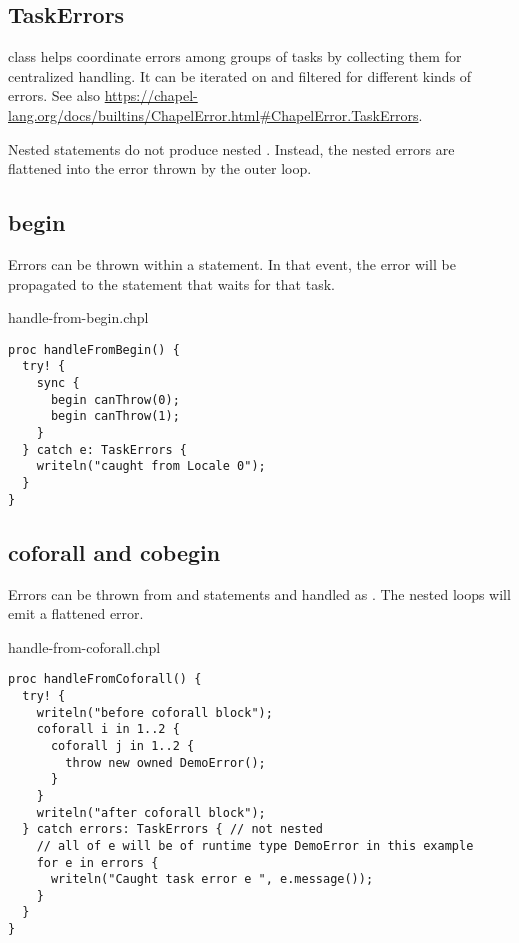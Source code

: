 \subsection{TaskErrors}
\label{TaskErrors}

 class helps coordinate errors among groups of tasks by collecting
them for centralized handling. It can be iterated on and filtered for
different kinds of errors. See also
\url{https://chapel-lang.org/docs/builtins/ChapelError.html#ChapelError.TaskErrors}.

Nested  statements do not produce nested .
Instead, the nested errors are flattened into the  error
thrown by the outer loop.

\subsection{begin}
\label{Errors_begin}

Errors can be thrown within a  statement. In that event, the error
will be propagated to the  statement that waits for that task.

\begin{chapelexample}{handle-from-begin.chpl}
\begin{chapel}
\begin{verbatim}
proc handleFromBegin() {
  try! {
    sync {
      begin canThrow(0);
      begin canThrow(1);
    }
  } catch e: TaskErrors {
    writeln("caught from Locale 0");
  }
}
\end{verbatim}
\end{chapel}
\end{chapelexample}

\subsection{coforall and cobegin}
\label{Errors_coforall_and_cobegin}

Errors can be thrown from  and 
statements and handled as . The nested 
loops will emit a flattened  error.

\begin{chapelexample}{handle-from-coforall.chpl}
\begin{chapel}
\begin{verbatim}
proc handleFromCoforall() {
  try! {
    writeln("before coforall block");
    coforall i in 1..2 {
      coforall j in 1..2 {
        throw new owned DemoError();
      }
    }
    writeln("after coforall block");
  } catch errors: TaskErrors { // not nested
    // all of e will be of runtime type DemoError in this example
    for e in errors {
      writeln("Caught task error e ", e.message());
    }
  }
}
\end{verbatim}
\end{chapel}
\end{chapelexample}

